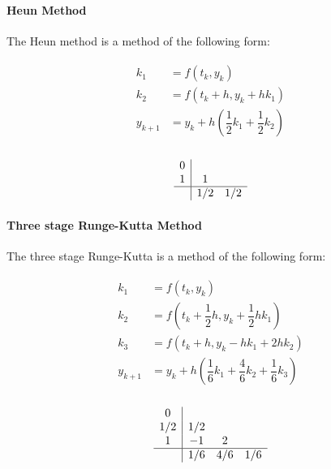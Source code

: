 \paragraph{Heun Method}
The Heun method is a method of the following form:

\begin{minipage}{0.45\textwidth}
	\begin{equation*}
	\begin{split}
	\begin{aligned}
	k_1 &= f(t_k,y_k) \\
	k_2 &= f\left(t_k+h,y_k+hk_1\right) \\
	y_{k+1} &= y_k + h\left( \dfrac{1}{2}k_1 + \dfrac{1}{2}k_2 \right) \\
	\end{aligned}
	\end{split}
	\label{eq::heun}
	\end{equation*}
\end{minipage}
\begin{minipage}{0.45\textwidth}
	\begin{equation}
	\begin{array}
	{c|cc}
	0      &  \\
	1      & 1 &  \\ \hline
	& 1/2  & 1/2
	\end{array}
	\end{equation}
\end{minipage}

\paragraph{Three stage Runge-Kutta Method}
The three stage Runge-Kutta is a method of the following form:

\begin{minipage}{0.45\textwidth}
	\begin{equation*}
		\begin{split}
		\begin{aligned}
		k_1 &= f(t_k,y_k) \\
		k_2 &= f\left( t_k+\dfrac{1}{2}h,y_k+\dfrac{1}{2}hk_1 \right) \\
		k_3 &= f\left( t_k+h,y_k-hk_1+2hk_2 \right) \\
		y_{k+1} &= y_k + h\left( \dfrac{1}{6}k_1 + \dfrac{4}{6}k_2 + \dfrac{1}{6}k_3 \right) \\
		\end{aligned}
		\end{split}
		\label{eq::3stage_rungekutta}
	\end{equation*}
\end{minipage}
\begin{minipage}{0.45\textwidth}
	\begin{equation}
	\begin{array}
	{c|ccc}
	0      &  \\
	1/2    & 1/2 &  \\
	1      & -1 & 2  \\ \hline
	& 1/6  & 4/6 & 1/6
	\end{array}
	\end{equation}
\end{minipage}

